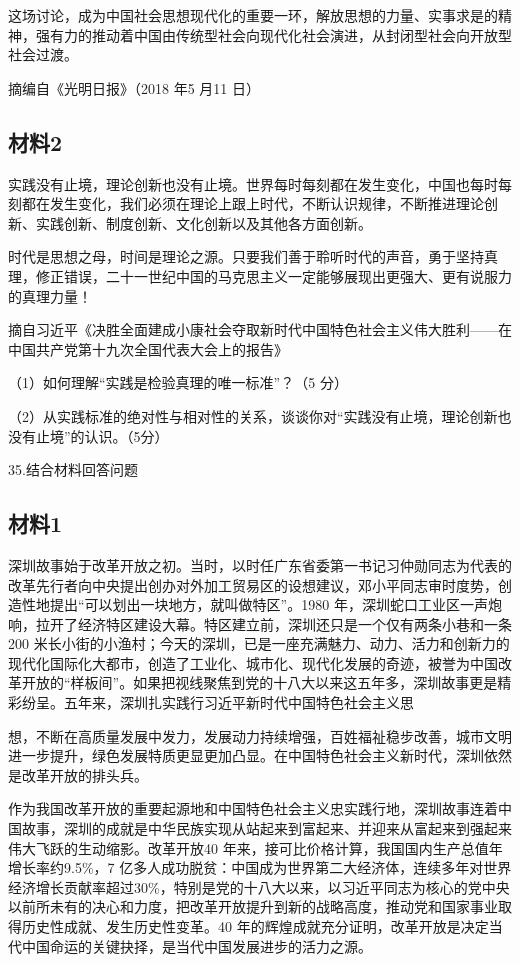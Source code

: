\documentclass[UTF8,11pt]{ctexart}
\begin{document}
这场讨论，成为中国社会思想现代化的重要一环，解放思想的力量、实事求是的精神，强有力的推动着中国由传统型社会向现代化社会演进，从封闭型社会向开放型社会过渡。

摘编自《光明日报》（2018 年5 月11 日）

\subsection*{材料2}

实践没有止境，理论创新也没有止境。世界每时每刻都在发生变化，中国也每时每刻都在发生变化，我们必须在理论上跟上时代，不断认识规律，不断推进理论创新、实践创新、制度创新、文化创新以及其他各方面创新。

时代是思想之母，时间是理论之源。只要我们善于聆听时代的声音，勇于坚持真理，修正错误，二十一世纪中国的马克思主义一定能够展现出更强大、更有说服力的真理力量！

摘自习近平《决胜全面建成小康社会夺取新时代中国特色社会主义伟大胜利——在中国共产党第十九次全国代表大会上的报告》

（1）如何理解“实践是检验真理的唯一标准”？（5 分）


（2）从实践标准的绝对性与相对性的关系，谈谈你对“实践没有止境，理论创新也没有止境”的认识。（5分）


35.结合材料回答问题


\subsection*{材料1}

深圳故事始于改革开放之初。当时，以时任广东省委第一书记习仲勋同志为代表的改革先行者向中央提出创办对外加工贸易区的设想建议，邓小平同志审时度势，创造性地提出“可以划出一块地方，就叫做特区”。1980 年，深圳蛇口工业区一声炮响，拉开了经济特区建设大幕。特区建立前，深圳还只是一个仅有两条小巷和一条200 米长小街的小渔村；今天的深圳，已是一座充满魅力、动力、活力和创新力的现代化国际化大都市，创造了工业化、城市化、现代化发展的奇迹，被誉为中国改革开放的“样板间”。如果把视线聚焦到党的十八大以来这五年多，深圳故事更是精彩纷呈。五年来，深圳扎实践行习近平新时代中国特色社会主义思


想，不断在高质量发展中发力，发展动力持续增强，百姓福祉稳步改善，城市文明进一步提升，绿色发展特质更显更加凸显。在中国特色社会主义新时代，深圳依然是改革开放的排头兵。

作为我国改革开放的重要起源地和中国特色社会主义忠实践行地，深圳故事连着中国故事，深圳的成就是中华民族实现从站起来到富起来、并迎来从富起来到强起来伟大飞跃的生动缩影。改革开放40 年来，接可比价格计算，我国国内生产总值年增长率约9.5\%，7 亿多人成功脱贫：中国成为世界第二大经济体，连续多年对世界经济增长贡献率超过30\%，特别是党的十八大以来，以习近平同志为核心的党中央以前所未有的决心和力度，把改革开放提升到新的战略高度，推动党和国家事业取得历史性成就、发生历史性变革。40 年的辉煌成就充分证明，改革开放是决定当代中国命运的关键抉择，是当代中国发展进步的活力之源。
\end{document}
